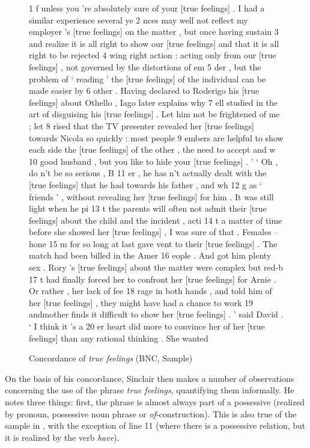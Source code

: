 \begin{figure}
\caption{Concordance of \textit{true feelings} (BNC, Sample)}
\label{fig:truefeelings}
\hrulefill
\begin{fitverb}
 1 f unless you 're absolutely sure of your [true feelings] . I had a similar experience several ye
 2 nces may well not reflect my employer 's [true feelings] on the matter , but once having sustain
 3  and realize it is all right to show our [true feelings] and that it is all right to be rejected
 4 wing right action : acting only from our [true feelings] , not governed by the distortions of em
 5 der , but the problem of ` reading ' the [true feelings] of the individual can be made easier by
 6  other . Having declared to Roderigo his [true feelings] about Othello , Iago later explains why
 7 ell studied in the art of disguising his [true feelings] . Let him not be frightened of me ; let
 8 rised that the TV presenter revealed her [true feelings] towards Nicola so quickly : most people
 9 embers are helpful to show each side the [true feelings] of the other , the need to accept and w
10 good husband , but you like to hide your [true feelings] . ' ` Oh , do n't be so serious , B
11  er , he has n't actually dealt with the [true feelings] that he had towards his father , and wh
12 g as ` friends ' , without revealing her [true feelings] for him . It was still light when he pi
13 t the parents will often not admit their [true feelings] about the child and the incident , acti
14 t a matter of time before she showed her [true feelings] , I was sure of that . Females -- hone
15 m for so long at last gave vent to their [true feelings] . The match had been billed in the Amer
16 eople . And got him plenty sex . Rory 's [true feelings] about the matter were complex but red-b
17 t had finally forced her to confront her [true feelings] for Arnie . Or rather , her lack of fee
18 rage in both hands , and told him of her [true feelings] , they might have had a chance to work
19 andmother finds it difficult to show her [true feelings] . ' said David . ` I think it 's a
20 er heart did more to convince her of her [true feelings] than any rational thinking . She wanted
\end{fitverb}
\hrulefill
\end{figure}

On the basis of his concordance,  Sinclair then makes a number of observations concerning the use of the phrase \textit{true feelings},  quantifying them informally. He notes three things: first, the phrase is almost always part of a possessive  (realized by pronoun,  possessive noun  phrase or \textit{of}-construction). This is also true of the sample in , with the exception of line 11 (where there is a possessive relation, but it is realized by the verb  \textit{have}).

